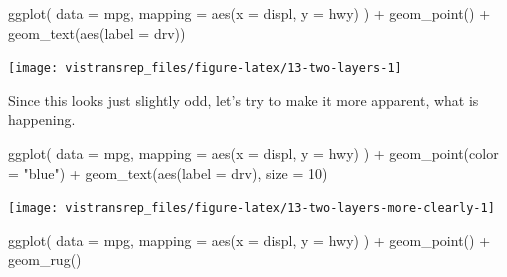 \documentclass[]{book}
\newenvironment{Shaded}{}{}
\newcommand{\DataTypeTok}[1]{#1}
\newcommand{\DecValTok}[1]{#1}
\newcommand{\KeywordTok}[1]{\textcolor[rgb]{0.00,0.00,1.00}{#1}}
\newcommand{\NormalTok}[1]{#1}
\newcommand{\OperatorTok}[1]{#1}
\newcommand{\StringTok}[1]{\textcolor[rgb]{0.00,0.50,0.50}{#1}}
\begin{document}
\begin{Shaded}
\begin{Highlighting}[]
\KeywordTok{ggplot}\NormalTok{(}
  \DataTypeTok{data =}\NormalTok{ mpg,}
  \DataTypeTok{mapping =} \KeywordTok{aes}\NormalTok{(}\DataTypeTok{x =}\NormalTok{ displ, }\DataTypeTok{y =}\NormalTok{ hwy)}
\NormalTok{) }\OperatorTok{+}
\StringTok{  }\KeywordTok{geom_point}\NormalTok{() }\OperatorTok{+}
\StringTok{  }\KeywordTok{geom_text}\NormalTok{(}\KeywordTok{aes}\NormalTok{(}\DataTypeTok{label =}\NormalTok{ drv))}
\end{Highlighting}
\end{Shaded}

\begin{flushright}\texttt{[image: vistransrep\_files/figure-latex/13-two-layers-1]} \end{flushright}

Since this looks just slightly odd, let's try to make it more apparent, what is happening.

\begin{Shaded}
\begin{Highlighting}[]
\KeywordTok{ggplot}\NormalTok{(}
  \DataTypeTok{data =}\NormalTok{ mpg,}
  \DataTypeTok{mapping =} \KeywordTok{aes}\NormalTok{(}\DataTypeTok{x =}\NormalTok{ displ, }\DataTypeTok{y =}\NormalTok{ hwy)}
\NormalTok{) }\OperatorTok{+}
\StringTok{  }\KeywordTok{geom_point}\NormalTok{(}\DataTypeTok{color =} \StringTok{"blue"}\NormalTok{) }\OperatorTok{+}
\StringTok{  }\KeywordTok{geom_text}\NormalTok{(}\KeywordTok{aes}\NormalTok{(}\DataTypeTok{label =}\NormalTok{ drv), }\DataTypeTok{size =} \DecValTok{10}\NormalTok{)}
\end{Highlighting}
\end{Shaded}

\begin{flushright}\texttt{[image: vistransrep\_files/figure-latex/13-two-layers-more-clearly-1]} \end{flushright}

\begin{Shaded}
\begin{Highlighting}[]
\KeywordTok{ggplot}\NormalTok{(}
  \DataTypeTok{data =}\NormalTok{ mpg,}
  \DataTypeTok{mapping =} \KeywordTok{aes}\NormalTok{(}\DataTypeTok{x =}\NormalTok{ displ, }\DataTypeTok{y =}\NormalTok{ hwy)}
\NormalTok{) }\OperatorTok{+}
\StringTok{  }\KeywordTok{geom_point}\NormalTok{() }\OperatorTok{+}
\StringTok{  }\KeywordTok{geom_rug}\NormalTok{()}
\end{Highlighting}
\end{Shaded}
\end{document}
